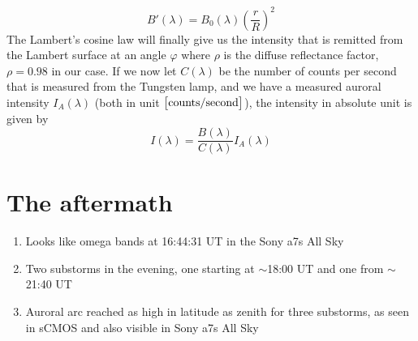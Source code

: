 \begin{equation*}
    B'(\lambda)=B_0(\lambda){\left(\frac{r}{R}\right)}^2
\end{equation*}
The Lambert's cosine law will finally give us the intensity that is remitted from the Lambert surface at an angle \(\varphi \)
where \(\rho \) is the diffuse reflectance factor, \(\rho=0.98\) in our case. If we now let \(C(\lambda)\) be the number of counts per second that is measured from the Tungsten lamp, and we have a measured auroral intensity \(I_A(\lambda)\) (both in unit \(\left[\textnormal{counts}/\textnormal{second}\right]\)), the intensity in absolute unit is given by
\begin{equation*}
    I(\lambda)=\frac{B(\lambda)}{C(\lambda)}I_A(\lambda)
\end{equation*}

\section{The aftermath}
\begin{enumerate}[\(\bullet \)]
    \item Looks like omega bands at 16:44:31 UT in the Sony a7s All Sky
    \item Two substorms in the evening, one starting at \(\sim \)18:00 UT and one from \(\sim \)21:40 UT
    \item Auroral arc reached as high in latitude as zenith for three substorms, as seen in sCMOS and also visible in Sony a7s All Sky
\end{enumerate}